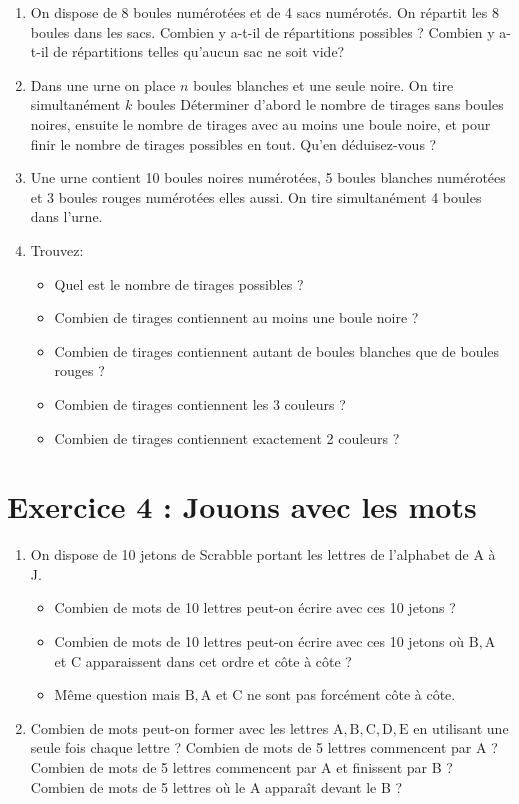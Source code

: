 \begin{enumerate}
    \item On dispose de 8 boules numérotées et de 4 sacs numérotés. On répartit les 8 boules dans les sacs. Combien y a-t-il de répartitions possibles ? Combien y a-t-il de répartitions telles qu'aucun sac ne soit vide?
    \item Dans une urne on place \(n\) boules blanches et une seule noire. On tire simultanément \(k\) boules Déterminer d'abord le nombre de tirages sans boules noires, ensuite le nombre de tirages avec au moins une boule noire, et pour finir le nombre de tirages possibles en tout. Qu'en déduisez-vous ?
    \item Une urne contient 10 boules noires numérotées, 5 boules blanches numérotées et 3 boules rouges numérotées elles aussi. On tire simultanément 4 boules dans l'urne.
    \item Trouvez:
    \begin{itemize}
    \item Quel est le nombre de tirages possibles ?
    \item Combien de tirages contiennent au moins une boule noire ?
    \item Combien de tirages contiennent autant de boules blanches que de boules rouges ?
    \item Combien de tirages contiennent les 3 couleurs ?
    \item Combien de tirages contiennent exactement 2 couleurs ?
    \end{itemize}
\end{enumerate}


\section*{Exercice 4 : Jouons avec les mots}

\begin{enumerate}
    \item On dispose de 10 jetons de Scrabble portant les lettres de l'alphabet de A à J.
    \begin{itemize}
    \item Combien de mots de 10 lettres peut-on écrire avec ces 10 jetons ?
    \item Combien de mots de 10 lettres peut-on écrire avec ces 10 jetons où \(\mathrm{B}, \mathrm{A}\) et C apparaissent dans cet ordre et côte à côte ?
    \item Même question mais \(\mathrm{B}, \mathrm{A}\) et C ne sont pas forcément côte à côte.
    \end{itemize}
    \item Combien de mots peut-on former avec les lettres \(\mathrm{A}, \mathrm{B}, \mathrm{C}, \mathrm{D}, \mathrm{E}\) en utilisant une seule fois chaque lettre ? Combien de mots de 5 lettres commencent par A ? Combien de mots de 5 lettres commencent par A et finissent par B ? Combien de mots de 5 lettres où le A apparaît devant le B ?
\end{enumerate}

